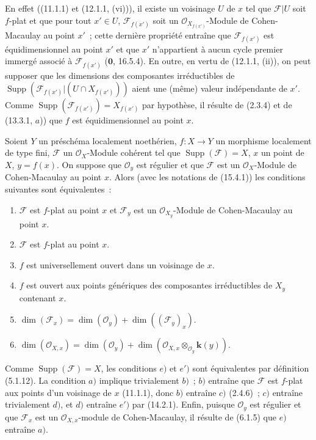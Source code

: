 En effet ((11.1.1) et (12.1.1, (vi))), il existe un voisinage $U$ de $x$ tel que
$\mathcal F|U$ soit $f$-plat et que pour tout $x'\in U$,
$\mathcal F_{f(x')}$ soit un $\mathcal O_{X_{f(x')}}$-Module de Cohen-Macaulay
au point $x'$~; cette dernière propriété entraîne que $\mathcal F_{f(x')}$ est
équidimensionnel au point $x'$ et que $x'$ n'appartient à aucun cycle premier
immergé associé à $\mathcal F_{f(x')}$ ($\mathbf{0}$, 16.5.4). En
outre, en vertu de (12.1.1, (ii)), on peut supposer que les dimensions des
composantes irréductibles de
$\operatorname{Supp}(\mathcal F_{f(x')}|(U\cap X_{f(x')}))$ aient une (même)
valeur indépendante de $x'$. Comme
$\operatorname{Supp}(\mathcal F_{f(x')})=X_{f(x')}$ par hypothèse, il résulte de
(2.3.4) et de (13.3.1, $a$)) que $f$ est équidimensionnel au point $x$.

\begin{proposition}[15.4.2]
Soient $Y$ un préschéma localement noethérien, $f:X\to Y$ un morphisme localement
de type fini, $\mathcal F$ un $\mathcal O_X$-Module cohérent tel que
$\operatorname{Supp}(\mathcal F)=X$, $x$ un point de $X$, $y=f(x)$. On suppose
que $\mathcal O_y$ est régulier et que $\mathcal F$ est un $\mathcal O_X$-Module
de Cohen-Macaulay au point $x$. Alors \textup{(avec les notations de (15.4.1))} les
conditions suivantes sont équivalentes~:
\begin{enumerate}[label=\emph{\alph*})]
  \item $\mathcal F$ est $f$-plat au point $x$ et $\mathcal F_y$ est un
  $\mathcal O_{X_y}$-Module de Cohen-Macaulay au point $x$.
  \item $\mathcal F$ est $f$-plat au point $x$.
  \item $f$ est universellement ouvert dans un voisinage de $x$.
  \item $f$ est ouvert aux points génériques des composantes irréductibles de
  $X_y$ contenant $x$.
  \item $\dim(\mathcal F_x)=\dim(\mathcal O_y)+\dim((\mathcal F_y)_x)$.
  \item[\emph{e}$'$)]
  $\dim(\mathcal O_{X,x})=\dim(\mathcal O_y)+
  \dim(\mathcal O_{X,x}\otimes_{\mathcal O_y}\boldsymbol{k}(y))$.
\end{enumerate}
\end{proposition}

Comme $\operatorname{Supp}(\mathcal F)=X$, les conditions $e)$ et $e')$ sont
équivalentes par définition (5.1.12). La condition $a)$ implique trivialement
$b)$~; $b)$ entraîne que $\mathcal F$ est $f$-plat aux points d'un voisinage de
$x$ (11.1.1), donc $b)$ entraîne $c)$ (2.4.6)~; $c)$ entraîne trivialement $d)$,
et $d)$ entraîne $e')$ par (14.2.1). Enfin, puisque $\mathcal O_y$ est régulier
et que $\mathcal F_x$ est un $\mathcal O_{X,x}$-module de Cohen-Macaulay, il
résulte de (6.1.5) que $e)$ entraîne $a)$.

